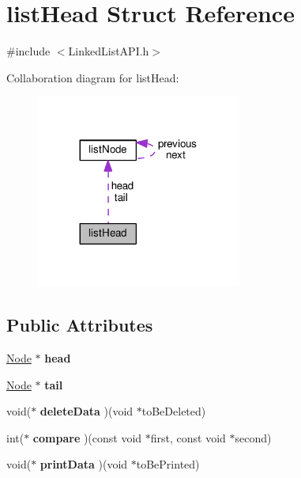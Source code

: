 \hypertarget{structlistHead}{}\section{list\+Head Struct Reference}
\label{structlistHead}


{\ttfamily \#include $<$Linked\+List\+A\+P\+I.\+h$>$}



Collaboration diagram for list\+Head\+:
\nopagebreak
\begin{figure}[H]
\begin{center}
\leavevmode
\includegraphics[width=191pt]{structlistHead__coll__graph}
\end{center}
\end{figure}
\subsection*{Public Attributes}
\begin{DoxyCompactItemize}
\item 
\mbox{\label{structlistHead_a824ef0b95a848fde5f0dc503480edb61}} 
\hyperlink{LinkedListAPI_8h_a2b677d2e8ffc156e6b24a55e7338ecad}{Node} $\ast$ {\bfseries head}
\item 
\mbox{\label{structlistHead_aafa27aceb900bf0e4ebf07857a0a94f3}} 
\hyperlink{LinkedListAPI_8h_a2b677d2e8ffc156e6b24a55e7338ecad}{Node} $\ast$ {\bfseries tail}
\item 
\mbox{\label{structlistHead_ae6fd9f56c9b85bd823c1c2e104c6ccaf}} 
void($\ast$ {\bfseries delete\+Data} )(void $\ast$to\+Be\+Deleted)
\item 
\mbox{\label{structlistHead_a0b7a3598d7dc73526fddff45a3e29595}} 
int($\ast$ {\bfseries compare} )(const void $\ast$first, const void $\ast$second)
\item 
\mbox{\label{structlistHead_a8247a7a84929fe9e4bdac0fb8dbf4633}} 
void($\ast$ {\bfseries print\+Data} )(void $\ast$to\+Be\+Printed)
\end{DoxyCompactItemize}


